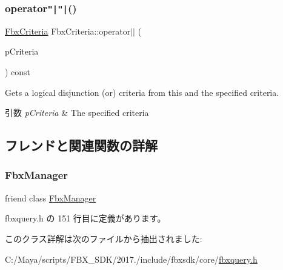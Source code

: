 \mbox{\label{class_fbx_criteria_a550446bf7c351b7cd09098bbe74d5d64}} 
\subsubsection{\texorpdfstring{operator\texttt{"|}\texttt{"|}()}{operator||()}}
{\footnotesize\ttfamily \hyperlink{class_fbx_criteria}{Fbx\+Criteria} Fbx\+Criteria\+::operator$\vert$$\vert$ (\begin{DoxyParamCaption}\item[{const \hyperlink{class_fbx_criteria}{Fbx\+Criteria} \&}]{p\+Criteria }\end{DoxyParamCaption}) const}

Gets a logical disjunction (or) criteria from this and the specified criteria. 
\begin{DoxyParams}{引数}
{\em p\+Criteria} & The specified criteria \\
\hline
\end{DoxyParams}


\subsection{フレンドと関連関数の詳解}
\mbox{\label{class_fbx_criteria_aa6292f0d09535e3fe957088d09276268}} 
\subsubsection{\texorpdfstring{Fbx\+Manager}{FbxManager}}
{\footnotesize\ttfamily friend class \hyperlink{class_fbx_manager}{Fbx\+Manager}\hspace{0.3cm}{\ttfamily [friend]}}



 fbxquery.\+h の 151 行目に定義があります。



このクラス詳解は次のファイルから抽出されました\+:\begin{DoxyCompactItemize}
\item 
C\+:/\+Maya/scripts/\+F\+B\+X\+\_\+\+S\+D\+K/2017./include/fbxsdk/core/\hyperlink{fbxquery_8h}{fbxquery.\+h}\end{DoxyCompactItemize}
